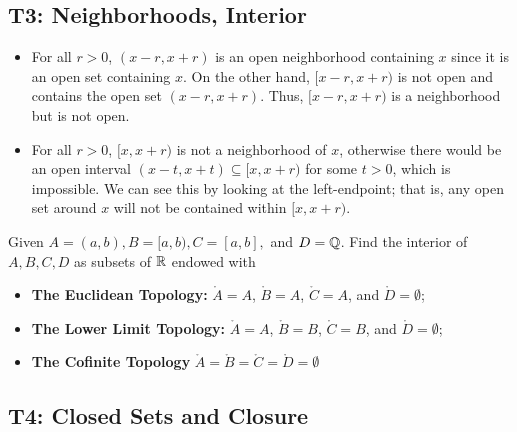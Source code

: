 \documentclass[a4paper]{article}
\begin{document}
\subsection*{T3: Neighborhoods, Interior}

\begin{eg}
    \begin{itemize}
        \item For all \( r > 0  \), \( (x-r, x + r) \) is an open neighborhood containing \( x  \) since it is an open set containing \( x  \). On the other hand, \( [x-r, x+r) \) is not open and contains the open set \( (x-r, x + r) \). Thus, \( [x-r,x+r) \) is a neighborhood but is not open. 
        \item For all \( r > 0  \), \( [x,x + r) \) is not a neighborhood of \( x  \), otherwise there would be an open interval \( (x-t,x+t) \subseteq  [x, x + r)  \) for some \( t  > 0  \), which is impossible. We can see this by looking at the left-endpoint; that is, any open set around \( x  \) will not be contained within \( [x,x+r) \).
    \end{itemize}
\end{eg}

\begin{eg}
    Given \( A = (a,b), B = [a,b), C = [a,b],    \) and \( D= \mathbb{Q}  \). Find the interior of \( A,B,C,D \) as subsets of \( \mathbb{R}  \) endowed with 
   \begin{itemize}
       \item \textbf{The Euclidean Topology:}
               \( \mathring{A} = A  \), \( \mathring{B} = A    \), \( \mathring{C} = A  \), and \( \mathring{D} = \emptyset \);
           \item \textbf{The Lower Limit Topology:}
\( \mathring{A} = A   \), \( \mathring{B} = B  \), \( \mathring{C} = B  \), and \( \mathring{D} = \emptyset \);
\item  \textbf{The Cofinite Topology} \( \mathring{A} = \mathring{B} = \mathring{C} = \mathring{D} = \emptyset \)
   \end{itemize} 
\end{eg}

\subsection*{T4: Closed Sets and Closure}
\end{document}
